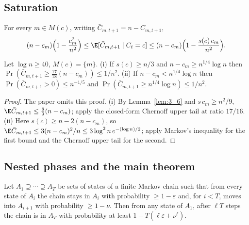 \subsection{Saturation}

\begin{lemma}[Lemma 3.6]\label{lem:3_6}
  \leanok
  For every $m \in M(c)$, writing $\bar C_{m,t+1} = n - C_{m,t+1}$,
  \[
    (n - c_m)\Bigl(1 - \frac{c_m^2}{n^2}\Bigr)
      \le \E[\bar C_{m,t+1} \mid C_t = c]
      \le (n - c_m)\Bigl(1 - \frac{s(c)\,c_m}{n^2}\Bigr).
  \]
\end{lemma}

\begin{lemma}\label{lem:3_7}
  \leanok
  Let $\log n \ge 40$, $M(c) = \{m\}$.
  (i) If $s(c) \ge n/3$ and $n - c_m \ge n^{1/4}\log n$ then
  $\Pr(\bar C_{m,t+1} \ge \frac{17}{18}(n - c_m)) \le 1/n^2$.
  (ii) If $n - c_m < n^{1/4}\log n$ then $\Pr(\bar C_{m,t+1} > 0) \le n^{-1/5}$
  and $\Pr(\bar C_{m,t+1} \ge n^{1/4}\log n) \le 1/n^2$.
\end{lemma}

\begin{proof}
  The paper omits this proof. (i) By Lemma~\ref{lem:3_6} and
  $s\,c_m \ge n^2/9$, $\E\bar C_{m,t+1} \le \frac89(n - c_m)$; apply the
  closed-form Chernoff upper tail at ratio $17/16$. (ii) Here
  $s(c) \ge n - 2(n - c_m)$, so $\E\bar C_{m,t+1} \le 3(n-c_m)^2/n
  \le 3\log^2 n\, e^{-(\log n)/2}$; apply Markov's inequality for the first
  bound and the Chernoff upper tail for the second.
\end{proof}

\subsection{Nested phases and the main theorem}

\begin{lemma}\label{lem:A_4}
  \leanok
  Let $A_1 \supseteq \cdots \supseteq A_T$ be sets of states of a finite
  Markov chain such that from every state of $A_i$ the chain stays in $A_i$
  with probability $\ge 1-\varepsilon$ and, for $i < T$, moves into
  $A_{i+1}$ with probability $\ge 1 - \nu$. Then from any state of $A_1$,
  after $\ell T$ steps the chain is in $A_T$ with probability at least
  $1 - T(\ell\varepsilon + \nu^\ell)$.
\end{lemma}


